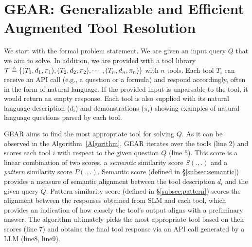 \documentclass[11pt]{article}
\newcommand{\llm}{\textcolor{darkredTwo}{LLM}}
\newcommand{\slm}{\textcolor{darkblueTwo}{SLM}}
\newcommand{\name}{{\fontfamily{cmss}\selectfont GEAR}}
\newcommand{\setof}[1]{\mleft \{ #1 \mright\}}  %
\begin{document}
\section{\name: Generalizable and Efficient Augmented Tool Resolution}
\label{sec:gear:details}

We start with the formal problem statement. 
We are given an input query $Q$ that we aim to solve. 
In addition, we are provided with a tool library 
$\mathcal{T} \triangleq \setof{(T_1, d_1, \pi_1), (T_2, d_2,\pi_2), \cdots, (T_n, d_n, \pi_n)}$ 
with $n$ tools. Each tool $T_i$ can receive an API call (e.g., a question or a formula) and respond accordingly, often in the form of natural language. If the provided input is unparsable to the tool, it would return an empty response. Each tool is also supplied with its natural language description ($d_i$) and demonstrations ($\pi_i$) 
showing examples of natural language questions parsed by each tool.

\name{} aims to find the most appropriate tool for solving $Q$. As it can be observed in the Algorithm~\ref{Algorithm}, \name{} iterates over the tools (line 2) and scores each tool $i$ with respect to the given question $Q$ (line 5).
This score is a linear combination of two scores, a \emph{semantic} similarity score $S(., .)$ and a \emph{pattern} similarity score $P(., .)$. Semantic score (defined in \S\ref{subsec:semantic}) provides a measure of semantic alignment between the tool description $d_i$ and the given query $Q$. Pattern similarity score (defined in \S\ref{subsec:pattern}) scores the alignment between the responses obtained from \slm{} and each tool, which provides an indication of how closely the tool's output aligns with a preliminary answer. The algorithm ultimately picks the most appropriate tool based on their scores (line 7) and obtains the final tool response via an API call generated by a \llm{} (line8, line9). 


\newcommand{\sample}{\xleftarrow{\text{sample}}}
\end{document}

